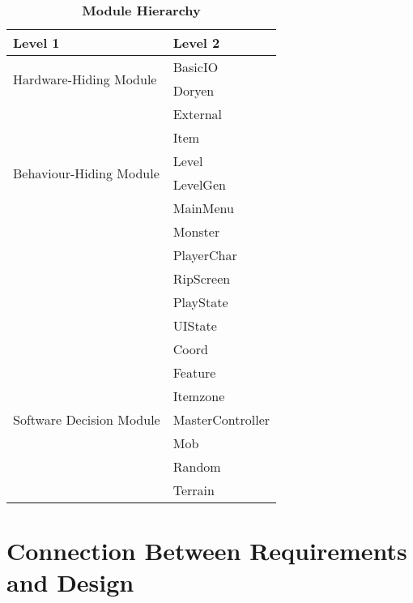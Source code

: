 \documentclass[12pt, titlepage]{article}
\newcommand{\newSection}[1]{
  \newpage
  \section{#1}
}
\begin{document}
    \begin{table}[h!]
        \caption{\bf Module Hierarchy}
        \label{TblMH}
        \bigskip
        \centering
        \begin{tabular}{p{} p{}}
            \toprule
            \textbf{Level 1} & \textbf{Level 2}\\
            \midrule

            \multirow{2}{0.3\textwidth}{Hardware-Hiding Module}
            & BasicIO\\
            & Doryen\\
            \midrule

            \multirow{6}{0.3\textwidth}{Behaviour-Hiding Module}
            & External\\
            & Item\\
            & Level\\
            & LevelGen\\
            & MainMenu\\  
            & Monster\\
            & PlayerChar\\
            & RipScreen\\
            & PlayState\\
            & UIState\\
            \midrule

            \multirow{9}{0.3\textwidth}{Software Decision Module}
            & Coord\\
            & Feature\\
            & Itemzone\\          
            & MasterController\\            
            & Mob\\
            & Random\\
            & Terrain\\
            \bottomrule

        \end{tabular}
    \end{table}

\newSection{Connection Between Requirements and Design} \label{SecConnection}

    
\end{document}

